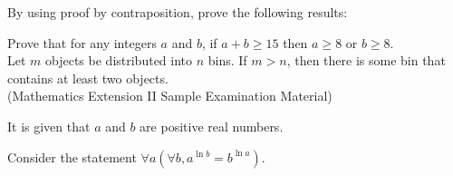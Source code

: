 \documentclass[11pt, a4paper, oneside]{exam}
\theoremstyle{definition}\newtheorem{define}{Definition}[section]
\theoremstyle{remark}\newtheorem{remark}{Remark}
\theoremstyle{definition}\newtheorem{example}{Example}[subsection]
\theoremstyle{definition}\newtheorem{notation}{Notation}[section]
\theoremstyle{definition}\newtheorem{theorem}{Theorem}[section]
\theoremstyle{definition}\newtheorem{corollary}{Corollary}[section]
\begin{document}
\begin{questions}



\question By using proof by contraposition, prove the following results:


\question[3] Prove that for any integers $a$ and $b$, if $a+b \geq 15$ then $a \geq 8$ or $b \geq 8$.\\

\question[3] Let $m$ objects be distributed into $n$ bins. If $m>n$, then there is some bin that contains at least two objects.\\


\question[2] (Mathematics Extension II Sample Examination Material)

It is given that $a$ and $b$ are positive real numbers. 

Consider the statement $\forall a(\forall b, a^{\ln b} = b^{\ln a})$.


\end{questions}
\end{document}
